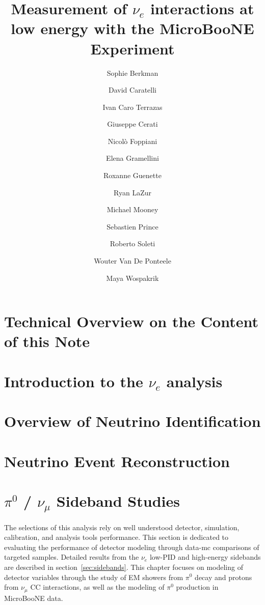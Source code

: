 \documentclass[a4paper]{article}
\title{Measurement of $\nu_e$ interactions at low energy with the MicroBooNE Experiment}
\author[1]{Sophie Berkman}
\author[1]{David Caratelli}
\author[2]{Ivan Caro Terrazas}
\author[1]{Giuseppe Cerati}
\author[3]{Nicol\`o Foppiani}
\author[1]{Elena Gramellini}
\author[3]{Roxanne Guenette}
\author[2]{Ryan LaZur}
\author[2]{Michael Mooney}
\author[3]{Sebastien Prince}
\author[3,4]{Roberto Soleti}
\author[3,4]{Wouter Van De Ponteele}
\author[1]{Maya Wospakrik}
\affil[1]{Fermi National Accelerator Laboratory}
\affil[2]{Colorado State University}
\affil[3]{Harvard University}
\affil[4]{University of Oxford}
\newcommand{\numu}{$\nu_{\mu}$\xspace}
\begin{document}
\maketitle


\tableofcontents

\newpage
\section{Technical Overview on the Content of this Note}

\newpage

\section{Introduction to the $\nu_e$ analysis}

\newpage

\section{Overview of Neutrino Identification}
\label{sec:sliceID}

\newpage

\section{Neutrino Event Reconstruction}
\label{sec:NuEvtReco}

\newpage

\section{$\pi^0$ / \numu Sideband Studies}
\label{sec:controls}

\par The selections of this analysis rely on well understood detector, simulation, calibration, and analysis tools performance. This section is dedicated to evaluating the performance of detector modeling through data-mc comparisons of targeted samples. Detailed results from the $\nu_e$ low-PID and high-energy sidebands are described in section~\ref{sec:sidebands}. This chapter focuses on modeling of detector variables through the study of EM showers from $\pi^0$ decay and protons from $\nu_{\mu}$ CC interactions, as well as the modeling of $\pi^0$ production in MicroBooNE data.
\end{document}
